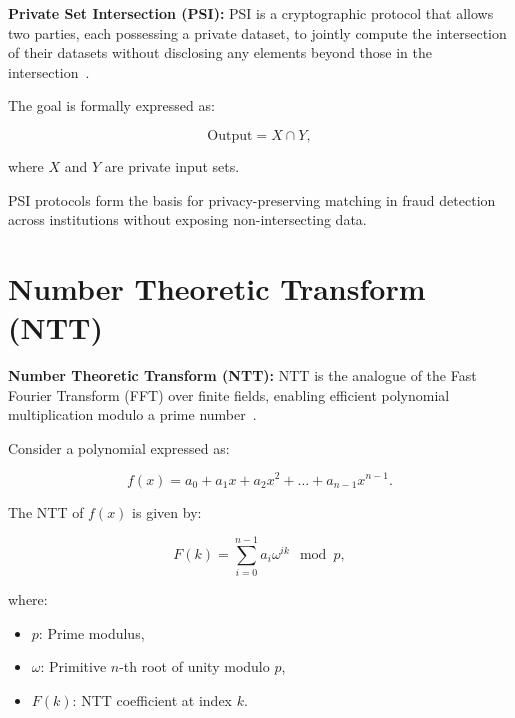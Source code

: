 \begin{definition}\label{def:psi}
\textbf{Private Set Intersection (PSI):} PSI is a cryptographic protocol that allows two parties, each possessing a private dataset, to jointly compute the intersection of their datasets without disclosing any elements beyond those in the intersection~\cite{pinkas2018efficient}.
\end{definition}

The goal is formally expressed as:

\begin{equation}\label{eq:psi}
\text{Output} = X \cap Y,
\end{equation}

where $X$ and $Y$ are private input sets.

\begin{remark}
PSI protocols form the basis for privacy-preserving matching in fraud detection across institutions without exposing non-intersecting data.
\end{remark}

\section{Number Theoretic Transform (NTT)}

\begin{definition}\label{def:ntt}
\textbf{Number Theoretic Transform (NTT):} NTT is the analogue of the Fast Fourier Transform (FFT) over finite fields, enabling efficient polynomial multiplication modulo a prime number~\cite{lindner2011better}.
\end{definition}

Consider a polynomial expressed as:

\[
f(x) = a_0 + a_1x + a_2x^2 + \dots + a_{n-1}x^{n-1}.
\]

The NTT of $f(x)$ is given by:

\begin{equation}\label{eq:ntt}
F(k) = \sum_{i=0}^{n-1} a_i \omega^{ik} \mod p,
\end{equation}

where:
\begin{itemize}
    \item $p$: Prime modulus,
    \item $\omega$: Primitive $n$-th root of unity modulo $p$,
    \item $F(k)$: NTT coefficient at index $k$.
\end{itemize}

\clearpage
